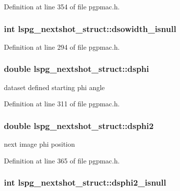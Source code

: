 Definition at line 354 of file pgpmac.\-h.

\hypertarget{structlspg__nextshot__struct_a5dd3db64790e09bc03499e521bbaa126}{
\subsubsection[{dsowidth\-\_\-isnull}]{\setlength{\rightskip}{0pt plus 5cm}int lspg\-\_\-nextshot\-\_\-struct\-::dsowidth\-\_\-isnull}}\label{structlspg__nextshot__struct_a5dd3db64790e09bc03499e521bbaa126}


Definition at line 294 of file pgpmac.\-h.

\hypertarget{structlspg__nextshot__struct_a64ebde597ca97a3b98145dc2d580c64f}{
\subsubsection[{dsphi}]{\setlength{\rightskip}{0pt plus 5cm}double lspg\-\_\-nextshot\-\_\-struct\-::dsphi}}\label{structlspg__nextshot__struct_a64ebde597ca97a3b98145dc2d580c64f}


dataset defined starting phi angle 



Definition at line 311 of file pgpmac.\-h.

\hypertarget{structlspg__nextshot__struct_a98857616b6bbb6ba861e96b6b7551756}{
\subsubsection[{dsphi2}]{\setlength{\rightskip}{0pt plus 5cm}double lspg\-\_\-nextshot\-\_\-struct\-::dsphi2}}\label{structlspg__nextshot__struct_a98857616b6bbb6ba861e96b6b7551756}


next image phi position 



Definition at line 365 of file pgpmac.\-h.

\hypertarget{structlspg__nextshot__struct_a57a9c43be86188f65b96d59c2adec674}{
\subsubsection[{dsphi2\-\_\-isnull}]{\setlength{\rightskip}{0pt plus 5cm}int lspg\-\_\-nextshot\-\_\-struct\-::dsphi2\-\_\-isnull}}\label{structlspg__nextshot__struct_a57a9c43be86188f65b96d59c2adec674}


